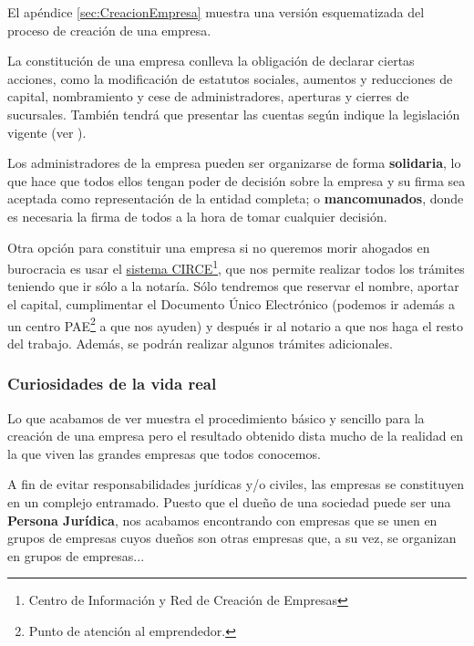 \documentclass[nochap,palatino,shortheader]{apuntes}
\newcommand{\study}[1]{#1} \newcommand{\substudy}[1]{#1}
\begin{document}
El apéndice \ref{sec:CreacionEmpresa} muestra una versión esquematizada del proceso de creación de una empresa.

La \study{constitución de una empresa} conlleva la \study{obligación de declarar} ciertas acciones, como la modificación de estatutos sociales, aumentos y reducciones de capital, nombramiento y cese de administradores, aperturas y cierres de sucursales. También tendrá que presentar las cuentas según indique la legislación vigente (ver ).

Los \study{administradores} de la empresa pueden ser \study{organizarse} de forma \study{\textbf{solidaria}}, lo que hace que todos ellos tengan poder de decisión sobre la empresa y su firma sea aceptada como representación de la entidad completa; o \study{\textbf{mancomunados}}, donde es necesaria la firma de todos a la hora de tomar cualquier decisión. %

Otra opción para constituir una empresa si no queremos morir ahogados en burocracia es usar el \href{http://www.creatuempresa.org/es-ES/PasoApaso/Paginas/etramitacion.aspx?cod=SRL&nombre=Sociedad%20de%20Responsabilidad%20Limitada&idioma=es-es}{sistema CIRCE}\footnote{Centro de Información y Red de Creación de Empresas}, que nos permite realizar todos los trámites teniendo que ir sólo a la notaría. Sólo tendremos que reservar el nombre, aportar el capital, cumplimentar el Documento Único Electrónico (podemos ir además a un centro PAE\footnote{Punto de atención al emprendedor.} a que nos ayuden) y después ir al notario a que nos haga el resto del trabajo. Además, se podrán realizar algunos trámites adicionales.

\subsubsection{Curiosidades de la vida real}
Lo que acabamos de ver muestra el procedimiento básico y sencillo para la creación de una empresa pero el resultado obtenido dista mucho de la realidad en la que viven las grandes empresas que todos conocemos.

A fin de evitar responsabilidades jurídicas y/o civiles, las empresas se constituyen en un complejo entramado. Puesto que el dueño de una sociedad puede ser una \textbf{Persona Jurídica}, nos acabamos encontrando con empresas que se unen en grupos de empresas cuyos dueños son otras empresas que, a su vez, se organizan en grupos de empresas...

\end{document}
